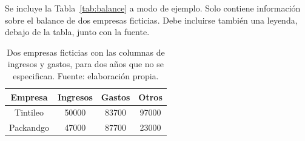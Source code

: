Se incluye la Tabla~\ref{tab:balance} a modo de ejemplo. Solo contiene información sobre el balance de dos empresas ficticias. Debe incluirse también una leyenda, debajo de la tabla, junto con la fuente.
\newline
\begin{table}[ht]
	\centering %
	\begin{tabular}{c c c c} %
		\hline\hline %
		Empresa & Ingresos & Gastos & Otros \\ [0.5ex] 
		\hline 
		Tintileo  & 50000 & 83700 & 97000 \\
		Packandgo & 47000 & 87700 & 23000 \\
		\hline
	\end{tabular}
	\caption[Balance de empresas]{Dos empresas ficticias con las columnas de ingresos y gastos, para dos años que no se especifican. Fuente: elaboración propia.}
	\label{tab:balance}
	\label{table:nonlin} %
\end{table}